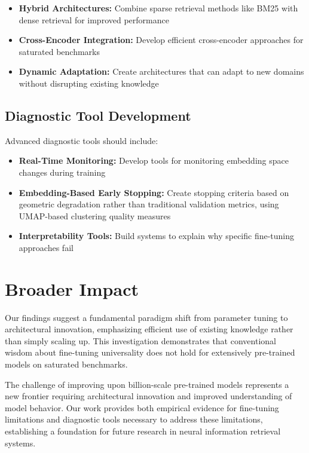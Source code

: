 \begin{itemize}
\item \textbf{Hybrid Architectures:} Combine sparse retrieval methods like BM25 with dense retrieval for improved performance
\item \textbf{Cross-Encoder Integration:} Develop efficient cross-encoder approaches for saturated benchmarks
\item \textbf{Dynamic Adaptation:} Create architectures that can adapt to new domains without disrupting existing knowledge
\end{itemize}

\subsection{Diagnostic Tool Development}

Advanced diagnostic tools should include:

\begin{itemize}
\item \textbf{Real-Time Monitoring:} Develop tools for monitoring embedding space changes during training
\item \textbf{Embedding-Based Early Stopping:} Create stopping criteria based on geometric degradation rather than traditional validation metrics, using UMAP-based clustering quality measures
\item \textbf{Interpretability Tools:} Build systems to explain why specific fine-tuning approaches fail
\end{itemize}

\section{Broader Impact}

Our findings suggest a fundamental paradigm shift from parameter tuning to architectural innovation, emphasizing efficient use of existing knowledge rather than simply scaling up. This investigation demonstrates that conventional wisdom about fine-tuning universality does not hold for extensively pre-trained models on saturated benchmarks.

The challenge of improving upon billion-scale pre-trained models represents a new frontier requiring architectural innovation and improved understanding of model behavior. Our work provides both empirical evidence for fine-tuning limitations and diagnostic tools necessary to address these limitations, establishing a foundation for future research in neural information retrieval systems.
